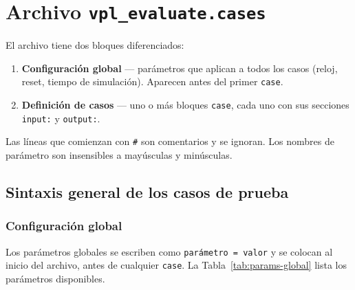 \documentclass[12pt, a4paper, twoside, openany]{book}
\begin{document}
\section{Archivo \texttt{vpl\_evaluate.cases}}
\label{sec:vpl-evaluate-cases}

El archivo tiene dos bloques diferenciados:

\begin{enumerate}
  \item \textbf{Configuración global} --- parámetros que aplican a todos los
        casos (reloj, reset, tiempo de simulación). Aparecen antes del primer
        \texttt{case}.
  \item \textbf{Definición de casos} --- uno o más bloques \texttt{case}, cada
        uno con sus secciones \texttt{input:} y \texttt{output:}.
\end{enumerate}

Las líneas que comienzan con \texttt{\#} son comentarios y se ignoran.
Los nombres de parámetro son insensibles a mayúsculas y minúsculas.

\subsection{Sintaxis general de los casos de prueba}
\label{subsec:sintaxis-general}

\subsubsection{Configuración global}

Los parámetros globales se escriben como \texttt{parámetro = valor} y se
colocan al inicio del archivo, antes de cualquier \texttt{case}.
La Tabla~\ref{tab:params-global} lista los parámetros disponibles.
\end{document}
